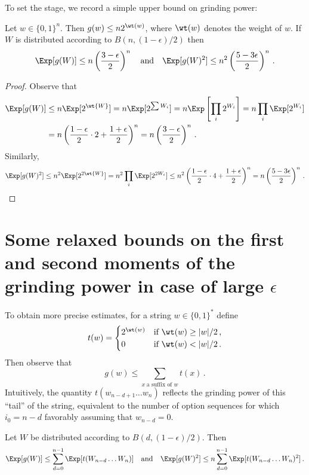 
To set the stage, we record a simple upper bound on grinding power:
\begin{proposition}\label{prop:praos-moments-simple}
  Let $w \in \{0,1\}^n$. Then $g(w) \leq n 2^{\wt(w)}$, where $\wt(w)$ denotes the weight of $w$. If $W$ is distributed according to $B(n,(1 - \epsilon)/2)$ then
  \[
    \Exp[g(W)] \leq n \left(\frac{3 - \epsilon}{2}\right)^n \quad\text{and}\quad\Exp[g(W)^2] \leq n^2\left(\frac{5 - 3\epsilon}{2}\right)^n\,.
  \]
\end{proposition}

\begin{proof}
  Observe that
  \begin{align*}
    \Exp[g(W)] 
    &\leq n\Exp[2^{\wt{W}}] 
    = n\Exp[2^{\sum W_i}] 
    = n\Exp\left[\prod_i 2^{W_i}\right] 
    = n\prod_i \Exp[2^{W_i}] \\
    &= n \left( \frac{1-\epsilon}{2} \cdot 2 + \frac{1 + \epsilon}{2}\right)^n 
    = n \left(\frac{3 - \epsilon}{2}\right)^n\,.
  \end{align*}
    Similarly,
  \[
    \Exp[g(W)^2] \leq n^2 \Exp[2^{2\wt{W}}] = n^2\prod_i \Exp[2^{2W_i}] \leq n^2\left( \frac{1-\epsilon}{2} \cdot 4 + \frac{1 + \epsilon}{2}\right)^n = n \left(\frac{5 - 3\epsilon}{2}\right)^n\,.\qedhere
  \]
\end{proof}

\section{Some relaxed bounds on the first and second moments of the grinding power in case of \texorpdfstring{large $\epsilon$}{highly-biased binomial distributions}}
To obtain more precise estimates, for a string $w \in \{0,1\}^*$ define
\[
  t(w) = \begin{cases}
    2^{\wt(w)} & \text{if $\wt(w) \geq |w|/2$\,,}\\
    0 & \text{if $\wt(w) < |w|/2$\,.}
  \end{cases}
\]
Then observe that
\begin{equation}\label{eq:g-decomposition}
  g(w) \leq \sum_{x\; \text{a suffix of $w$}} t(x)\,.
\end{equation}
Intuitively, the quantity $t(w_{n-d+1} \ldots w_n)$ reflects the grinding power of this ``tail'' of the string, equivalent to the number of option sequences for which $i_0 = n-d$ favorably assuming that $w_{n-d} = 0$.
\begin{proposition}\label{prop:moments-general}
  Let $W$ be distributed according to $B(d,(1 - \epsilon)/2)$. Then
  \[
    \Exp[g(W)] \leq \sum_{d = 0}^{n-1} \Exp[t(W_{n-d} \ldots W_n)] \quad \text{and}\quad \Exp[g(W)^2] \leq n \sum_{d = 0}^{n-1} \Exp[t(W_{n-d} \ldots W_n)^2]\,.
  \]
\end{proposition}

